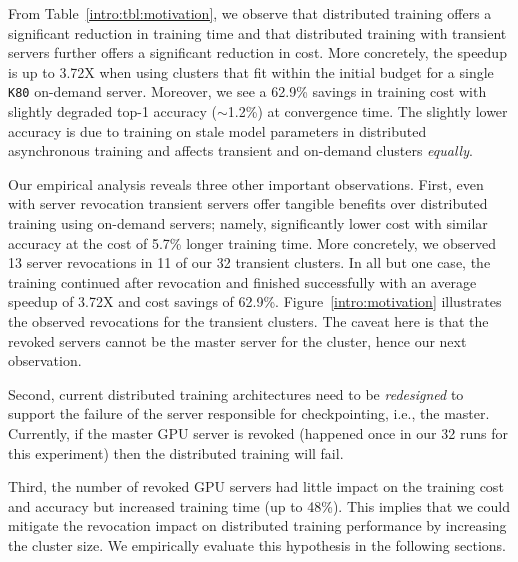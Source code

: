 From Table~\ref{intro:tbl:motivation}, we observe that distributed training
offers a significant reduction in training time and that distributed training
with transient servers further offers a significant reduction in cost. More
concretely, the speedup is up to 3.72X when using clusters that fit within the
initial budget for a single \texttt{K80} on-demand server.  Moreover, we see a 62.9\%
savings in training cost with slightly degraded top-1 accuracy ($\sim$1.2\%) at
convergence time. The slightly lower accuracy is due to training on stale model
parameters in distributed asynchronous training and affects transient and
on-demand clusters \emph{equally}. 

Our empirical analysis reveals three other important observations.  First, even
with server revocation transient servers offer tangible benefits over distributed training using on-demand
servers; namely, significantly lower cost with similar accuracy at the cost of 5.7\%
longer training time. More concretely, we observed 13 server revocations in 11 of our 32
transient clusters. In all but one case, the training continued after
revocation and finished successfully with an average speedup of 3.72X and cost
savings of 62.9\%. 
Figure~\ref{intro:motivation} illustrates the observed
revocations for the transient clusters. The caveat here is that the revoked
servers cannot be the master server for the cluster, hence our next
observation. 

Second, current distributed training architectures need to be \emph{redesigned} to
support the failure of the server responsible for checkpointing, i.e., the
master. Currently, if the master GPU server is revoked (happened once in our 32
runs for this experiment) then the distributed training will fail. 

Third, the number of revoked GPU servers had little impact on the training cost
and accuracy but increased training time (up to 48\%). This implies that we
could mitigate the revocation impact on distributed training performance by
increasing the cluster size. We empirically evaluate this hypothesis in
the following sections.

